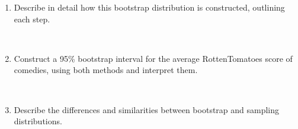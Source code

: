 \documentclass[12pt]{article}
\newcommand{\soln}[2]{$\:$\\ \vspace{#1}}{}
\begin{document}
\begin{enumerate}

\item Describe in detail how this bootstrap distribution is constructed, outlining each step.

\soln{5cm}{
\begin{enumerate}
\item Take a random sample of size 54, with replacement, from the original sample.
\item Find the mean of this sample, and record it.
\item Repeat steps 1 and 2 200 times.
\end{enumerate}
}

\pagebreak

\item Construct a 95\% bootstrap interval for the average RottenTomatoes score of comedies, using both 
methods and interpret them.

\soln{5cm}{
Percentile: Count 5 dots from each end -- roughly (49 - 56.8) \\
SE: $52.52 \pm 2.01 \times 1.98 \approx (48.5, 56.5)$ \\
We are 95\% confident that the average RT score of comedies is in these intervals.
}

\item Describe the differences and similarities between bootstrap and sampling distributions.

\soln{5cm}{
Similarity: Sample with replacement, sample size equal to original sample size. \\
Difference: Sampling dist constructed sampling from the pop, boot dist constructed sampling from the sample.
}

\end{enumerate}

\end{document}
